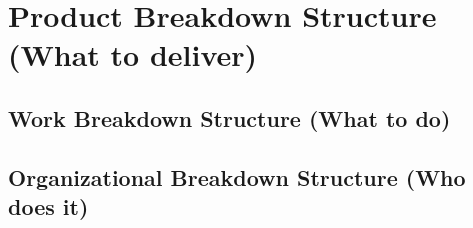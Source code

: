 
\section*{Product Breakdown Structure (What to deliver)} %
\label{sec:product_breakdown_structure_what_to_deliver_}


\subsection*{Work Breakdown Structure (What to do)} %
\label{sub:work_breakdown_structure}


\subsection*{Organizational Breakdown Structure (Who does it)} %
\label{sub:organizational_breakdown_structure}


